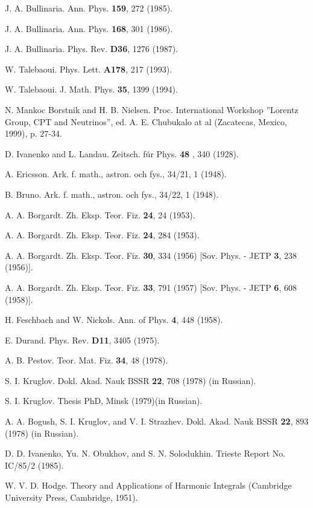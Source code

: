 \documentclass[a4paper,12pt]{article}
\begin{document}
\begin{thebibliography}{99}
\bibitem{}  J. A. Bullinaria. Ann. Phys. \textbf{159}, 272 (1985).

\bibitem{}  J. A. Bullinaria. Ann. Phys. \textbf{168}, 301 (1986).

\bibitem{}  J. A. Bullinaria. Phys. Rev. \textbf{D36}, 1276 (1987).

\bibitem{}  W. Talebaoui. Phys. Lett. \textbf{A178}, 217 (1993).

\bibitem{}  W. Talebaoui. J. Math. Phys. \textbf{35}, 1399 (1994).

\bibitem{}  N. Mankoc Borstnik and H. B. Nielsen. Proc. International
Workshop ''Lorentz Group, CPT and Neutrinos'', ed. A. E. Chubukalo
at al (Zacatecas, Mexico, 1999), p. 27-34.

\bibitem{}  D. Ivanenko and L. Landau. Zeitsch. f\"ur Phys. \textbf{48
}, 340 (1928).

\bibitem{}  A. Ericsson. Ark. f. math., astron. och fys., 34/21, 1 (1948).

\bibitem{}  B. Bruno. Ark. f. math., astron. och fys., 34/22, 1 (1948).

\bibitem{}  A. A. Borgardt. Zh. Eksp. Teor. Fiz. \textbf{24}, 24 (1953).

\bibitem{}  A. A. Borgardt. Zh. Eksp. Teor. Fiz. \textbf{24}, 284 (1953).

\bibitem{}  A. A. Borgardt. Zh. Eksp. Teor. Fiz. \textbf{30}, 334 (1956)
[Sov. Phys. - JETP \textbf{3}, 238 (1956)].

\bibitem{}  A. A. Borgardt. Zh. Eksp. Teor. Fiz. \textbf{33}, 791 (1957)
[Sov. Phys. - JETP \textbf{6}, 608 (1958)].

\bibitem{}  H. Feschbach and W. Nickols. Ann. of Phys. \textbf{4},
448 (1958).

\bibitem{}  E. Durand. Phys. Rev. \textbf{D11}, 3405 (1975).

\bibitem{}  A. B. Pestov. Teor. Mat. Fiz. \textbf{34}, 48 (1978).

\bibitem{}  S. I. Kruglov. Dokl. Akad. Nauk BSSR \textbf{22}, 708 (1978) (in
Russian).

\bibitem{}  S. I. Kruglov. Thesis PhD, Minsk (1979)(in Russian).

\bibitem{}  A. A. Bogush, S. I. Kruglov, and V. I. Strazhev. Dokl.
Akad. Nauk BSSR \textbf{22}, 893 (1978) (in Russian).

\bibitem{}  D. D. Ivanenko, Yu. N. Obukhov, and S. N. Solodukhin.
Trieste Report No. IC/85/2 (1985).

\bibitem{}  W. V. D. Hodge. Theory and Applications of Harmonic
Integrals (Cambridge University Press, Cambridge, 1951).


\end{thebibliography}
\end{document}
